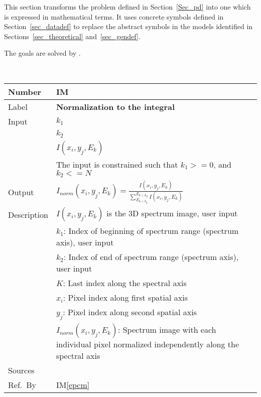 \documentclass[12pt]{article}
\newcommand{\colAwidth}{0.13\textwidth}
\newcommand{\colBwidth}{0.82\textwidth}
\newcounter{instnum} %
\newcommand{\iref}[1]{IM\ref{#1}}
\begin{document}
This section transforms the problem defined in Section~\ref{Sec_pd} into 
one which is expressed in mathematical terms. It uses concrete symbols defined 
in Section~\ref{sec_datadef} to replace the abstract symbols in the models 
identified in Sections~\ref{sec_theoretical} and~\ref{sec_gendef}.

The goals  are solved by .  

~\newline


\noindent
\begin{minipage}{\textwidth}
	\renewcommand*{\arraystretch}{1.5}
	\begin{tabular}{| p{\colAwidth} | p{\colBwidth}|}
		  \hline
		  \rowcolor[gray]{0.9}
		  Number& IM{instnum}\theinstnum \label{ewat}\\
		  \hline
		  Label& \bf Normalization to the integral\\
		  \hline
		  Input& $k_1$\\
		  & $k_2$\\
		  & $I(x_i,y_j,E_k)$\\
		  & The input is constrained such that $k_1 >= 0$, and $k_2 <= N$\\
		  \hline
		  Output& $I_{norm}(x_i,y_j,E_k)=\frac{I(x_i,y_j,E_k)}{\sum_{E_{k=k_1}}^{E_{k=k_2}} I(x_i,y_j,E_k)}$\\
		  \hline
		  Description&$I(x_i,y_j,E_k)$ is the 3D spectrum image, user input\\
		  &$k_1$: Index of beginning of spectrum range (spectrum axis), user input\\
		  &$k_2$: Index of end of spectrum range (spectrum axis), user input\\
		  &$K$: Last index along the spectral axis\\
		  &$x_i$: Pixel index along first spatial axis\\
		  &$y_j$: Pixel index along second spatial axis\\
		  &$I_{norm}(x_i,y_j,E_k)$: Spectrum image with each individual pixel normalized independently along the spectral axis\\
		  \hline
		  Sources&~\cite{Lightstone2012} \ \\
		  \hline
		  Ref.\ By & \iref{epcm}\\
		  \hline
	\end{tabular}
\end{minipage}\\
\end{document}
